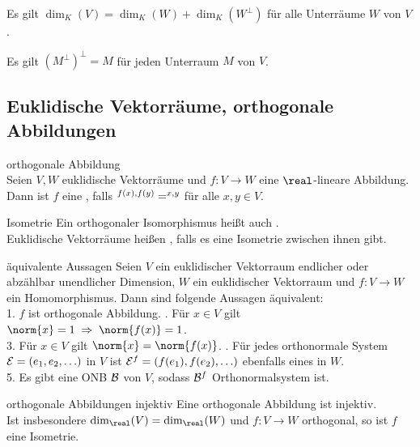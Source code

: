 \begin{Kor}
    Es gilt $\dim_K(V) = \dim_K(W) + \dim_K(W^\bot)$ für alle Unterräume
    $W$ von $V$.
\end{Kor}

\begin{Kor}
    Es gilt $(M^\bot)^\bot = M$ für jeden Unterraum $M$ von $V$.
\end{Kor}

\subsection{%
    Euklidische Vektorräume, orthogonale Abbildungen%
}

\begin{Def}{orthogonale Abbildung} \\
    Seien $V, W$ euklidische Vektorräume und $f: V \rightarrow W$ eine
    $\real$-lineare Abbildung. \\
    Dann ist $f$ eine , falls
    $\sp{f(x), f(y)} = \sp{x, y}$ für alle $x, y \in V$.
\end{Def}

\begin{Def}{Isometrie}
    Ein orthogonaler Isomorphismus heißt auch . \\
    Euklidische Vektorräume heißen , falls es eine
    Isometrie zwischen ihnen gibt.
\end{Def}

\begin{Satz}{äquivalente Aussagen}
    Seien $V$ ein euklidischer Vektorraum endlicher oder abzählbar unendlicher
    Dimension, $W$ ein euklidischer Vektorraum und $f: V \rightarrow W$ ein
    Homomorphismus.
    Dann sind folgende Aussagen äquivalent: \\
    1. $f$ ist orthogonale Abbildung. . Für $x \in V$ gilt
    $\norm{x} = 1 \;\Rightarrow\; \norm{f(x)} = 1$. \\
    3. Für $x \in V$ gilt $\norm{x} = \norm{f(x)}$. . Für jedes orthonormale System $\mathcal{E} = (e_1, e_2, \ldots)$ in $V$
    ist $\mathcal{E}^f = (f(e_1), f(e_2), \ldots)$ ebenfalls eines in $W$. \\
    5. Es gibt eine ONB $\mathcal{B}$ von $V$, sodass $\mathcal{B}^f$
    Orthonormalsystem ist.
\end{Satz}

\begin{Satz}{orthogonale Abbildungen injektiv}
    Eine orthogonale Abbildung ist injektiv. \\
    Ist insbesondere $\dim_\real(V) = \dim_\real(W)$ und $f: V \rightarrow W$
    orthogonal, so ist $f$ eine Isometrie.
\end{Satz}

